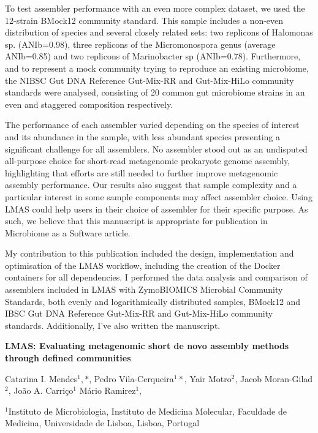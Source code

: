 To test assembler performance with an even more complex dataset, we used the 12-strain BMock12 community standard. This sample includes a non-even distribution of species and several closely related sets: two replicons of Halomonas sp. (ANIb=0.98), three replicons of the Micromonospora genus (average ANIb=0.85) and two replicons of Marinobacter sp (ANIb=0.78). Furthermore, and to represent a mock community trying to reproduce an existing microbiome, the NIBSC Gut DNA Reference Gut-Mix-RR and Gut-Mix-HiLo community standards were analysed, consisting of 20 common gut microbiome strains in an even and staggered composition respectively.

The performance of each assembler varied depending on the species of interest and its abundance in the sample, with less abundant species presenting a significant challenge for all assemblers. No assembler stood out as an undisputed all-purpose choice for short-read metagenomic prokaryote genome assembly, highlighting that efforts are still needed to further improve metagenomic assembly performance. Our results also suggest that sample complexity and a particular interest in some sample components may affect assembler choice. Using LMAS could help users in their choice of assembler for their specific purpose.  As such, we believe that this manuscript is appropriate for publication in Microbiome as a Software article. 

My contribution to this publication included the design, implementation and optimisation of the LMAS workflow, including the creation of the Docker containers for all dependencies. I performed the data analysis and comparison of assemblers included in LMAS with ZymoBIOMICS Microbial Community Standards, both evenly and logarithmically distributed samples, BMock12 and IBSC Gut DNA Reference Gut-Mix-RR and Gut-Mix-HiLo community standards. Additionally, I've also written the manuscript.

\cleardoublepage 

\begin{center}
\large
\textbf{LMAS: Evaluating metagenomic short de novo assembly methods through defined communities}
\end{center}

Catarina I. Mendes$^1,*$, 
Pedro Vila-Cerqueira$^1*$,
Yair Motro$^2$,
Jacob Moran-Gilad$^2$,
João A. Carriço$^1$
Mário Ramirez$^1$, 


$^1$Instituto de Microbiologia, Instituto de Medicina Molecular, Faculdade de Medicina, Universidade de Lisboa, Lisboa, Portugal 

